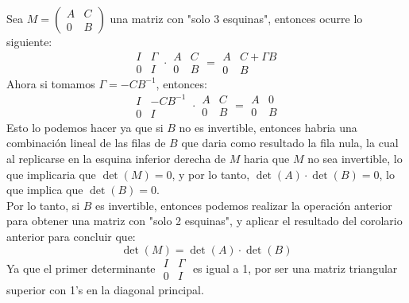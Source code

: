 \begin{corolario}
    Sea $M = \left( \begin{array}{c|c} A & C \\ \hline 0 & B \end{array} \right)$ una matriz con "solo 3 esquinas", entonces ocurre lo siguiente:
    \[
        \begin{array}{|c|c|}
            I & \Gamma \\
            \hline
            0 & I
        \end{array}
        \cdot
        \begin{array}{|c|c|}
            A & C \\
            \hline
            0 & B
        \end{array} =
        \begin{array}{|c|c|}
            A & C + \Gamma B \\
            \hline
            0 & B
        \end{array}
    \]
    Ahora si tomamos $\Gamma = -CB^{-1}$, entonces:
    \[
        \begin{array}{|c|c|}
            I & -CB^{-1} \\
            \hline
            0 & I
        \end{array}
        \cdot
        \begin{array}{|c|c|}
            A & C \\
            \hline
            0 & B
        \end{array} =
        \begin{array}{|c|c|}
            A & 0 \\
            \hline
            0 & B
        \end{array}
    \]
    Esto lo podemos hacer ya que si $B$ no es invertible, entonces habria una combinación lineal de las filas de $B$ que daria como resultado la fila nula, la cual al replicarse en la esquina inferior derecha de $M$ haria que $M$ no sea invertible, lo que implicaria que $\det(M) = 0$, y por lo tanto, $\det(A) \cdot \det(B) = 0$, lo que implica que $\det(B) = 0$.\\
    Por lo tanto, si $B$ es invertible, entonces podemos realizar la operación anterior para obtener una matriz con "solo 2 esquinas", y aplicar el resultado del corolario anterior para concluir que:
    \[
        \det(M) = \det(A) \cdot \det(B)
    \]
    Ya que el primer determinante $\begin{array}{|c|c|}
            I & \Gamma \\
            \hline
            0 & I
        \end{array} $ es igual a 1, por ser una matriz triangular superior con 1's en la diagonal principal.
\end{corolario}

